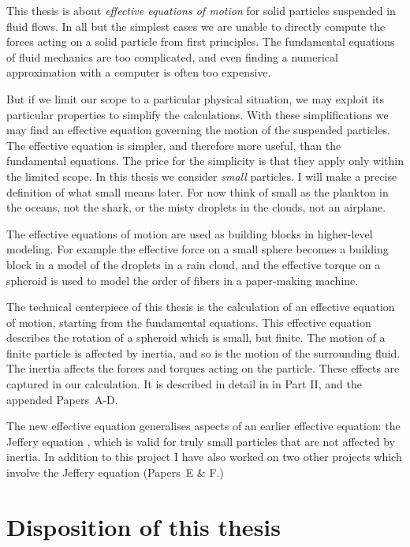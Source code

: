 \documentclass[thesis.tex]{subfiles}
\begin{document}
This thesis is about \emph{effective equations of motion} for solid particles suspended in fluid flows. In all but the simplest cases we are unable to directly compute the forces acting on a solid particle from first principles. The fundamental equations of fluid mechanics are too complicated, and even finding a numerical approximation with a computer is often too expensive.

But if we limit our scope to a particular physical situation, we may exploit its particular properties to simplify the calculations. With these simplifications we may find an effective equation governing the motion of the suspended particles. The effective equation is simpler, and therefore more useful, than the fundamental equations. The price for the simplicity is that they apply only within the limited scope. In this thesis we consider \emph{small} particles. I will make a precise definition of what small means later. For now think of small as the plankton in the oceans, not the shark, or the misty droplets in the clouds, not an airplane.

The effective equations of motion are used as building blocks in higher-level modeling. For example the effective force on a small sphere becomes a building block in a model of the droplets in a rain cloud, and the effective torque on a spheroid is used to model the order of fibers in a paper-making machine.

The technical centerpiece of this thesis is the calculation of an effective equation of motion, starting from the fundamental equations. This effective equation describes the rotation of a spheroid which is small, but finite. The motion of a finite particle is affected by inertia, and so is the motion of the surrounding fluid. The inertia affects the forces and torques acting on the particle. These effects are captured in our calculation. It is described in detail in  in Part II, and the appended Papers~A-D.

The new effective equation generalises aspects of an earlier effective equation: the Jeffery equation \cite{jeffery1922}, which is valid for truly small particles that are not affected by inertia. In addition to this project I have also worked on two other projects which involve the Jeffery equation (Papers~E \& F.)

\section*{Disposition of this thesis}
\end{document}
